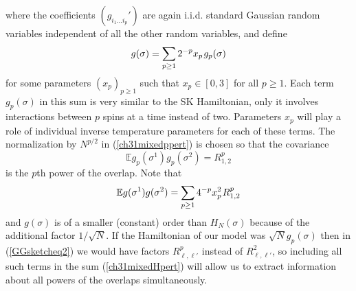 \documentclass[12pt]{article}
\newcommand{\smsp}{\hspace{0.3mm}}
\newcommand{\e}{\mathbb{E}}
\theoremstyle{nonumberplain}
\begin{document}
where the coefficients $(g_{i_1\ldots i_p}')$ are again i.i.d. standard Gaussian random variables independent of all the other random variables, and define
\begin{equation}
g(\sigma) = \sum_{p\geq 1} 2^{-p} x_p\smsp g_{p}(\sigma)
\label{ch31mixedHpert}
\end{equation}
for some parameters $(x_p)_{p\geq 1}$ such that $x_p\in[0,3]$ for all $p\geq 1$. Each term $g_p(\sigma)$ in this sum is very similar to the SK Hamiltonian, only it involves interactions between $p$ spins at a time instead of two. Parameters $x_p$ will play a role of individual inverse temperature parameters for each of these terms. The normalization by $N^{p/2}$ in (\ref{ch31mixedppert}) is chosen so that the covariance
\begin{equation}
\e g_p(\sigma^1) g_p(\sigma^2) = R_{1,2}^p
\end{equation}
is the $p$th power of the overlap. Note that
\begin{equation}
\e g(\sigma^1) g(\sigma^2) = \sum_{p\geq 1} 4^{-p} x_p^2\smsp R_{1,2}^p
\label{ch31Covxipert}
\end{equation}
and $g(\sigma)$ is of a smaller (constant) order than $H_N(\sigma)$ because of the additional factor $1/\sqrt{N}$. If the Hamiltonian of our model was $\sqrt{N}g_p(\sigma)$ then in (\ref{GGsketcheq2}) we would have factors $R_{\ell,\ell'}^p$ instead of $R_{\ell,\ell'}^2$, so including all such terms in the sum (\ref{ch31mixedHpert}) will allow us to extract information about all powers of the overlaps simultaneously. 
\end{document}

